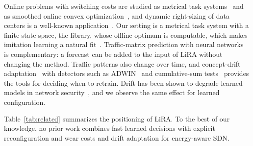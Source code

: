 \documentclass[journal]{IEEEtran}
\begin{document}
Online problems with switching costs are studied as metrical task systems~\cite{borodin1992mts} and as smoothed online convex optimization~\cite{chen2018obd}, and dynamic right-sizing of data centers is a well-known application~\cite{lin2013rightsizing}. Our setting is a metrical task system with a finite state space, the library, whose offline optimum is computable, which makes imitation learning a natural fit~\cite{ross2011dagger}. Traffic-matrix prediction with neural networks~\cite{azzouni2018neutm} is complementary: a forecast can be added to the input of LiRA without changing the method. Traffic patterns also change over time, and concept-drift adaptation~\cite{gama2014drift,lu2019drift} with detectors such as ADWIN~\cite{bifet2007adwin} and cumulative-sum tests~\cite{page1954cusum} provides the tools for deciding when to retrain. Drift has been shown to degrade learned models in network security~\cite{andresini2021insomnia}, and we observe the same effect for learned configuration.

Table~\ref{tab:related} summarizes the positioning of LiRA. To the best of our knowledge, no prior work combines fast learned decisions with explicit reconfiguration and wear costs and drift adaptation for energy-aware SDN.
\end{document}

